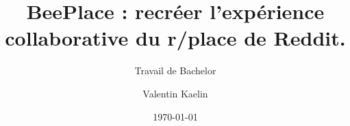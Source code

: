 \author{Valentin Kaelin}


\title{BeePlace : recréer l'expérience collaborative du r/place de Reddit.}

\subtitle{Travail de Bachelor}


\date{\today}


